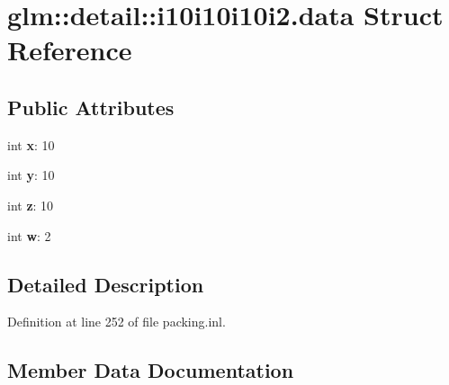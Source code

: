 \hypertarget{structglm_1_1detail_1_1i10i10i10i2_8data}{}\section{glm\+:\+:detail\+:\+:i10i10i10i2.\+data Struct Reference}
\label{structglm_1_1detail_1_1i10i10i10i2_8data}
\subsection*{Public Attributes}
\begin{DoxyCompactItemize}
\item 
\mbox{\label{structglm_1_1detail_1_1i10i10i10i2_8data_a9dd4e461268c8034f5c8564e155c67a6}} 
int {\bfseries x}\+: 10
\item 
\mbox{\label{structglm_1_1detail_1_1i10i10i10i2_8data_a415290769594460e2e485922904f345d}} 
int {\bfseries y}\+: 10
\item 
\mbox{\label{structglm_1_1detail_1_1i10i10i10i2_8data_afbade9e36a3f36d3d676c1b808451dd7}} 
int {\bfseries z}\+: 10
\item 
\mbox{\label{structglm_1_1detail_1_1i10i10i10i2_8data_af1290186a5d0b1ceab27f4e77c0c5d68}} 
int {\bfseries w}\+: 2
\end{DoxyCompactItemize}


\subsection{Detailed Description}


Definition at line 252 of file packing.\+inl.



\subsection{Member Data Documentation}
\mbox{\label{structglm_1_1detail_1_1i10i10i10i2_8data_af1290186a5d0b1ceab27f4e77c0c5d68}} 
